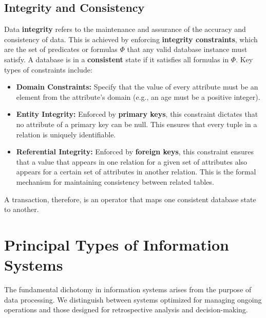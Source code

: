 \subsection{Integrity and Consistency}
Data \textbf{integrity} refers to the maintenance and assurance of the accuracy and consistency of data. This is achieved by enforcing \textbf{integrity constraints}, which are the set of predicates or formulas $\Phi$ that any valid database instance must satisfy. A database is in a \textbf{consistent} state if it satisfies all formulas in $\Phi$. Key types of constraints include:
\begin{itemize}
    \item \textbf{Domain Constraints:} Specify that the value of every attribute must be an element from the attribute's domain (e.g., an age must be a positive integer).
    \item \textbf{Entity Integrity:} Enforced by \textbf{primary keys}, this constraint dictates that no attribute of a primary key can be null. This ensures that every tuple in a relation is uniquely identifiable.
    \item \textbf{Referential Integrity:} Enforced by \textbf{foreign keys}, this constraint ensures that a value that appears in one relation for a given set of attributes also appears for a certain set of attributes in another relation. This is the formal mechanism for maintaining consistency between related tables.
\end{itemize}
A transaction, therefore, is an operator that maps one consistent database state to another.

\section{Principal Types of Information Systems}

The fundamental dichotomy in information systems arises from the purpose of data processing. We distinguish between systems optimized for managing ongoing operations and those designed for retrospective analysis and decision-making.

